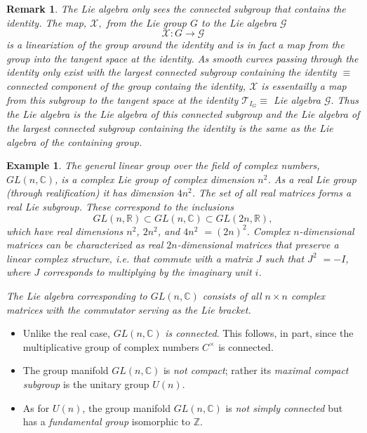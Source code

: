 \documentclass[aps,preprint]{revtex4}%
\newtheorem{example}[theorem]{Example}
\newtheorem{remark}[theorem]{Remark}
\begin{document}
\begin{remark}
The Lie algebra \emph{only sees the} \emph{connected subgroup that contains
the identity}. The map, $\mathcal{X},$ from the Lie group $G$ to the Lie
algebra $\mathcal{G}$
\begin{equation}
\mathcal{X}:G\rightarrow\mathcal{G}%
\end{equation}
is a lineariztion of the group around the identity and is in fact a map from
the group into the \emph{tangent space} at the identity. As smooth curves
passing through the identity only exist with the largest connected subgroup
containing the identity $\equiv$ connected component of the group containg the
identity, $\mathcal{X}$ is essentailly a map from this subgroup to the tangent
space at the identity $\mathcal{T}_{I_{G}}\equiv$ Lie algebra $\mathcal{G}.$
\emph{Thus the Lie algebra is the Lie algebra of this connected subgroup and
the Lie algebra of the largest connected subgroup containing the identity is
the same as the Lie algebra of the containing group.}
\end{remark}

\begin{example}
The general linear group over the field of complex numbers, $GL(n,\mathbb{C}%
)$, is a complex Lie group of complex dimension $n^{2}$. As a real Lie group
(through \emph{realification}) it has dimension $4n^{2}$. The set of all real
matrices forms a real Lie subgroup. These correspond to the inclusions%
\begin{equation}
GL(n,\mathbb{R})\subset GL(n,\mathbb{C})\subset GL(2n,\mathbb{R}),
\end{equation}
which have real dimensions $n^{2}$, $2n^{2}$, and $4n^{2}$ $=(2n)^{2}$.
Complex $n$-dimensional matrices can be characterized as real $2n$-dimensional
matrices that preserve a linear complex structure, i.e. that \emph{commute
with a matrix} $J$ such that $J^{2}$ $=-I$, where $J$ corresponds to
multiplying by the imaginary unit $i$.

The Lie algebra corresponding to $GL(n,\mathbb{C})$ consists of all $n\times
n$ complex matrices with the commutator serving as the Lie bracket. 
\end{example}

\begin{itemize}
\item Unlike the real case, $GL(n,\mathbb{C})$ \emph{is connected}. This
follows, in part, since the multiplicative group of complex numbers
$C^{\times}$ is connected.

\item The group manifold $GL(n,\mathbb{C})$ is \emph{not compact}; rather its
\emph{maximal compact subgroup} is the unitary group $U(n)$. 

\item As for $U(n)$, the group manifold $GL(n,\mathbb{C})$ is \emph{not simply
connected} but has a \emph{fundamental group} isomorphic to $\mathbb{Z}$.
\end{itemize}
\end{document}
